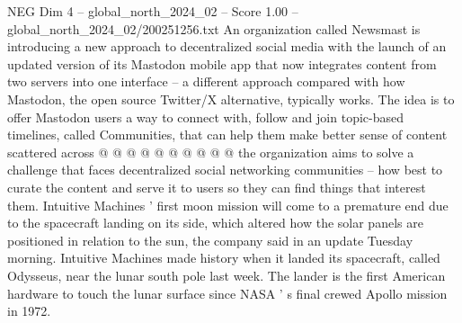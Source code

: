 \begin{textsample}{NEG Dim 4 – global\_north\_2024\_02 – Score 1.00 – global\_north\_2024\_02/200251256.txt}
An organization called Newsmast is introducing a new approach to decentralized social media with the launch of an updated version of its Mastodon mobile app that now integrates content from two servers into one interface -- a different approach compared with how Mastodon, the open source Twitter/X alternative, typically works.
The idea is to offer Mastodon users a way to connect with, follow and join topic-based timelines, called Communities, that can help them make better sense of content scattered across @ @ @ @ @ @ @ @ @ @ the organization aims to solve a challenge that faces decentralized social networking communities -- how best to curate the content and serve it to users so they can find things that interest them.
Intuitive Machines ' first moon mission will come to a premature end due to the spacecraft landing on its side, which altered how the solar panels are positioned in relation to the sun, the company said in an update Tuesday morning.
Intuitive Machines made history when it landed its spacecraft, called Odysseus, near the lunar south pole last week.
The lander is the first American hardware to touch the lunar surface since NASA ' s final crewed Apollo mission in 1972.

\end{textsample}
